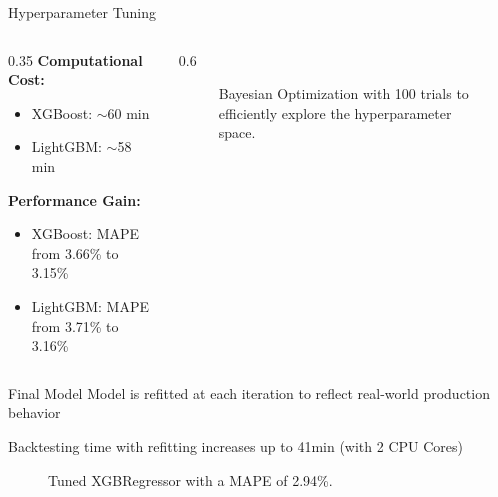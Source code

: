\documentclass[10pt, aspectratio=169]{beamer}
\begin{document}
\begin{frame}{Hyperparameter Tuning}
    \begin{columns}[onlytextwidth]
        \begin{column}{0.35\textwidth}    
            \textbf{Computational Cost:}
            \begin{itemize}
                \item XGBoost: $\sim$60 min
                \item LightGBM: $\sim$58 min
            \end{itemize}
            
            \textbf{Performance Gain:}
            \begin{itemize}
                \item XGBoost: MAPE from 3.66\% to 3.15\%
                \item LightGBM: MAPE from 3.71\% to 3.16\%
            \end{itemize}
        \end{column}
        \begin{column}{0.6\textwidth}
            \centering
            \begin{figure}
                \centering
                
                \caption{Bayesian Optimization with 100 trials to efficiently explore the hyperparameter space.}
                \label{fig:tuning}
            \end{figure}
        \end{column}
    \end{columns}
\end{frame}

\begin{frame}{Final Model}
    Model is refitted at each iteration to reflect real-world production behavior

    Backtesting time with refitting increases up to 41min (with 2 CPU Cores)
    \begin{figure}
        \centering
        
        \caption{Tuned XGBRegressor with a MAPE of 2.94\%.}
        \label{fig:final_model}
    \end{figure}
\end{frame}
\end{document}
